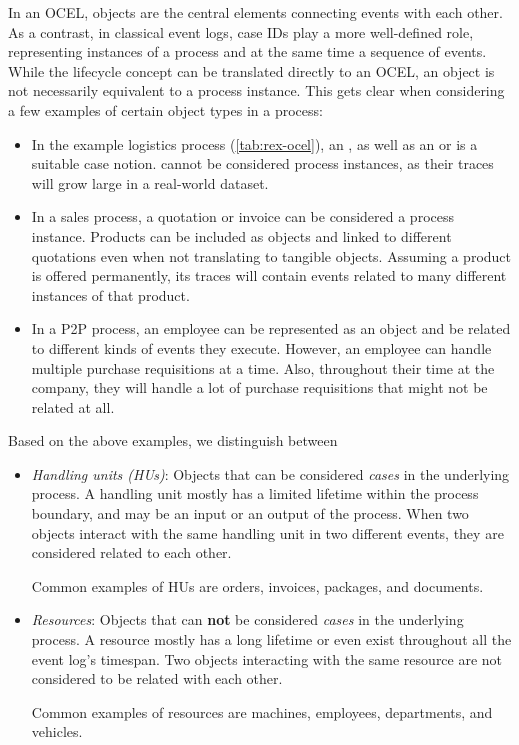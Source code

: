In an OCEL, objects are the central elements connecting events with each other. As a contrast, in classical event logs, case IDs play a more well-defined role, representing instances of a process and at the same time a sequence of events.
While the lifecycle concept can be translated directly to an OCEL,
an object is not necessarily equivalent to a process instance. This gets clear when considering a few examples of certain object types in a process:
\begin{itemize}
  \item In the example logistics process (\autoref{tab:rex-ocel}), an , as well as an  or  is a suitable case notion.  cannot be considered process instances, as their traces will grow large in a real-world dataset.
  \item In a sales process, a quotation or invoice can be considered a process instance. Products can be included as objects and linked to different quotations even when not translating to tangible objects. Assuming a product is offered permanently, its traces will contain events related to many different instances of that product.
  \item In a P2P process, an employee can be represented as an object and be related to different kinds of events they execute. However, an employee can handle multiple purchase requisitions at a time. Also, throughout their time at the company, they will handle a lot of purchase requisitions that might not be related at all.
\end{itemize}
Based on the above examples, we distinguish between
\begin{itemize}
  \item \textit{Handling units (HUs)}: Objects that can be considered \textit{cases} in the underlying process. A handling unit mostly has a limited lifetime within the process boundary, and may be an input or an output of the process. When two objects interact with the same handling unit in two different events, they are considered related to each other.
  
  Common examples of HUs are orders, invoices, packages, and documents.

  \item \textit{Resources}: Objects that can \textbf{not} be considered \textit{cases} in the underlying process. A resource mostly has a long lifetime or even exist throughout all the event log's timespan. Two objects interacting with the same resource are not considered to be related with each other.
  
  Common examples of resources are machines, employees, departments, and vehicles.
\end{itemize}

